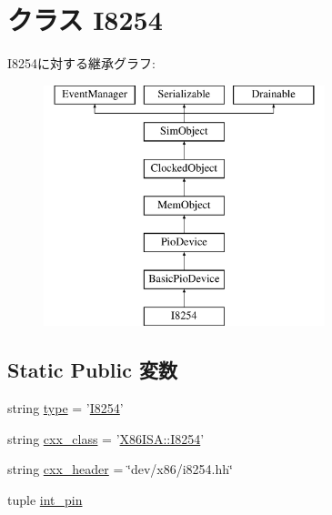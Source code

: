 \hypertarget{classI8254_1_1I8254}{
\section{クラス I8254}
\label{classI8254_1_1I8254}
}
I8254に対する継承グラフ:\begin{figure}[H]
\begin{center}
\leavevmode
\includegraphics[height=7cm]{classI8254_1_1I8254}
\end{center}
\end{figure}
\subsection*{Static Public 変数}
\begin{DoxyCompactItemize}
\item 
string \hyperlink{classI8254_1_1I8254_acce15679d830831b0bbe8ebc2a60b2ca}{type} = '\hyperlink{classI8254_1_1I8254}{I8254}'
\item 
string \hyperlink{classI8254_1_1I8254_a58cd55cd4023648e138237cfc0822ae3}{cxx\_\-class} = '\hyperlink{classX86ISA_1_1I8254}{X86ISA::I8254}'
\item 
string \hyperlink{classI8254_1_1I8254_a17da7064bc5c518791f0c891eff05fda}{cxx\_\-header} = \char`\"{}dev/x86/i8254.hh\char`\"{}
\item 
tuple \hyperlink{classI8254_1_1I8254_a3e36d424287a16839b81d9c82d52c36a}{int\_\-pin}
\end{DoxyCompactItemize}


